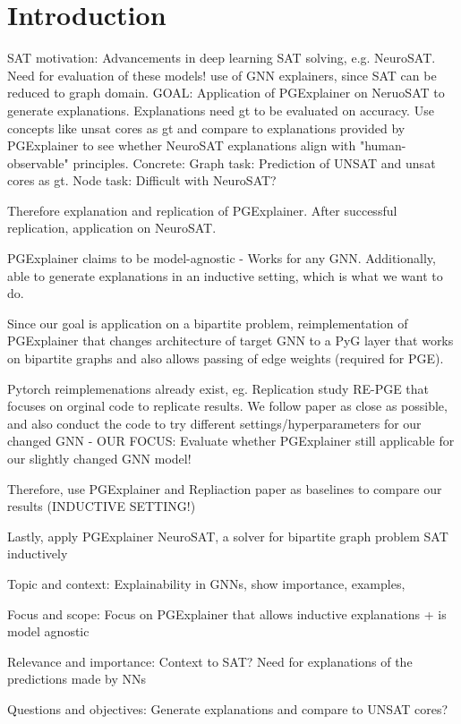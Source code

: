 \chapter{Introduction}
\label{ch:Introduction}

SAT motivation: Advancements in deep learning SAT solving, e.g. NeuroSAT. Need for evaluation of these models! use of GNN explainers, since SAT can be reduced to graph domain. GOAL: Application of PGExplainer on NeruoSAT to generate explanations. Explanations need gt to be evaluated on accuracy. Use concepts like unsat cores as gt and compare to explanations provided by PGExplainer to see whether NeuroSAT explanations align with "human-observable" principles.
Concrete: Graph task: Prediction of UNSAT and unsat cores as gt. Node task: Difficult with NeuroSAT?\bigskip

Therefore explanation and replication of PGExplainer. After successful replication, application on NeuroSAT. \bigskip

PGExplainer claims to be model-agnostic - Works for any GNN. Additionally, able to generate explanations in an inductive setting, which is what we want to do.\bigskip

Since our goal is application on a bipartite problem, reimplementation of PGExplainer that changes architecture of target GNN to a PyG layer that works on bipartite graphs and also allows passing of edge weights (required for PGE).\bigskip

Pytorch reimplemenations already exist, eg. Replication study RE-PGE that focuses on orginal code to replicate results. We follow paper as close as possible, and also conduct the code to try different settings/hyperparameters for our changed GNN - OUR FOCUS: Evaluate whether PGExplainer still applicable for our slightly changed GNN model!\bigskip

Therefore, use PGExplainer and Repliaction paper as baselines to compare our results (INDUCTIVE SETTING!) \bigskip

Lastly, apply PGExplainer NeuroSAT, a solver for bipartite graph problem SAT inductively




Topic and context: Explainability in GNNs, show importance, examples, 

Focus and scope: Focus on PGExplainer that allows inductive explanations + is model agnostic

Relevance and importance: Context to SAT? Need for explanations of the predictions made by NNs

Questions and objectives: Generate explanations and compare to UNSAT cores?